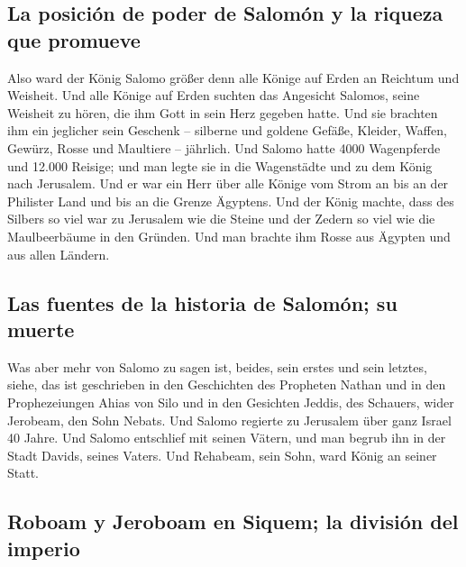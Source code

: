 \hypertarget{la-posiciuxf3n-de-poder-de-salomuxf3n-y-la-riqueza-que-promueve}{%
\subsection{La posición de poder de Salomón y la riqueza que
promueve}\label{la-posiciuxf3n-de-poder-de-salomuxf3n-y-la-riqueza-que-promueve}}

 Also ward der König Salomo größer denn alle Könige auf
Erden an Reichtum und Weisheit.  Und alle Könige auf
Erden suchten das Angesicht Salomos, seine Weisheit zu hören, die ihm
Gott in sein Herz gegeben hatte.  Und sie brachten ihm
ein jeglicher sein Geschenk -- silberne und goldene Gefäße, Kleider,
Waffen, Gewürz, Rosse und Maultiere -- jährlich.  Und
Salomo hatte 4000 Wagenpferde und 12.000 Reisige; und man legte sie in
die Wagenstädte und zu dem König nach Jerusalem.  Und er
war ein Herr über alle Könige vom Strom an bis an der Philister Land und
bis an die Grenze Ägyptens.  Und der König machte, dass
des Silbers so viel war zu Jerusalem wie die Steine und der Zedern so
viel wie die Maulbeerbäume in den Gründen.  Und man
brachte ihm Rosse aus Ägypten und aus allen Ländern.

\hypertarget{las-fuentes-de-la-historia-de-salomuxf3n-su-muerte}{%
\subsection{Las fuentes de la historia de Salomón; su
muerte}\label{las-fuentes-de-la-historia-de-salomuxf3n-su-muerte}}

 Was aber mehr von Salomo zu sagen ist, beides, sein
erstes und sein letztes, siehe, das ist geschrieben in den Geschichten
des Propheten Nathan und in den Prophezeiungen Ahias von Silo und in den
Gesichten Jeddis, des Schauers, wider Jerobeam, den Sohn Nebats.
 Und Salomo regierte zu Jerusalem über ganz Israel 40
Jahre.  Und Salomo entschlief mit seinen Vätern, und man
begrub ihn in der Stadt Davids, seines Vaters. Und Rehabeam, sein Sohn,
ward König an seiner Statt.

\hypertarget{roboam-y-jeroboam-en-siquem-la-divisiuxf3n-del-imperio}{%
\subsection{Roboam y Jeroboam en Siquem; la división del
imperio}\label{roboam-y-jeroboam-en-siquem-la-divisiuxf3n-del-imperio}}

